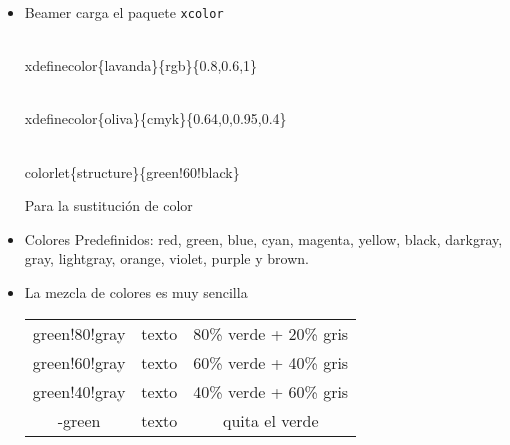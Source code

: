\documentclass[11pt]{beamer}
\begin{document}
\begin{frame}
\begin{itemize}[<+-| alert@+>]
\item Beamer carga el paquete \texttt{xcolor}

\begin{block}{} \scriptsize
\begin{semiverbatim}
\\xdefinecolor\{lavanda\}\{rgb\}\{0.8,0.6,1\}

\\xdefinecolor\{oliva\}\{cmyk\}\{0.64,0,0.95,0.4\}
\end{semiverbatim}
\end{block}

\begin{block}{} \scriptsize
\begin{semiverbatim}
\\colorlet\{structure\}\{green!60!black\}
\end{semiverbatim}
Para la sustituci\'on de color
\end{block}

\item Colores Predefinidos: red, green, blue,
cyan, magenta, yellow, black, darkgray, gray, lightgray, orange,
violet, purple y brown.



\item La mezcla de colores es muy sencilla
\begin{center}
\begin{tabular}{ccc}
\hline
  green!80!gray & {\color{verde1} texto} & 80\% verde + 20\% gris \\
  green!60!gray & {\color{verde2} texto} & 60\% verde + 40\% gris \\
  green!40!gray & {\color{verde3} texto} &  40\% verde + 60\% gris\\
  -green & {\color{verde4} texto} & quita el verde \\
  \hline
\end{tabular}
\end{center}

\end{itemize}
\end{frame}
\end{document}
